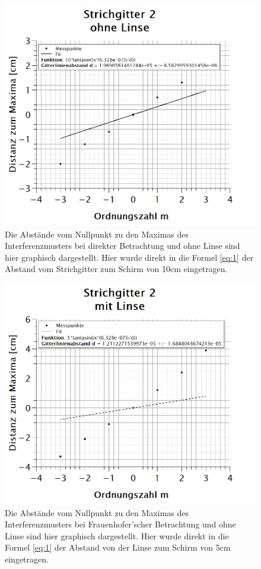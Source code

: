 \begin{figure}[h]
\includegraphics[width=\textwidth]{Bilder/strichgitter2_ohneLinse.png} 
\caption[Strichgitter 2: ohne Linse]{Die Abstände vom Nullpunkt zu den Maximas des Interferenzmusters bei direkter Betrachtung und ohne Linse sind hier graphisch dargestellt. Hier wurde direkt in die Formel \ref{eq:1} der Abstand vom Strichgitter zum Schirm von 10cm eingetragen.}
\label{fig:strichgitter2_ohneLinse}
\end{figure}
\newpage
\begin{figure}[h]
\includegraphics[width=\textwidth]{Bilder/strichgitter2_mitLinse.png} 
\caption[Strichgitter 2: mit Linse]{Die Abstände vom Nullpunkt zu den Maximas des Interferenzmusters bei Frauenhofer'scher Betrachtung und ohne Linse sind hier graphisch dargestellt. Hier wurde direkt in die Formel \ref{eq:1} der Abstand von der Linse zum Schirm von 5cm eingetragen.}
\label{fig:strichgitter1_mitLinse}
\end{figure}
\newpage